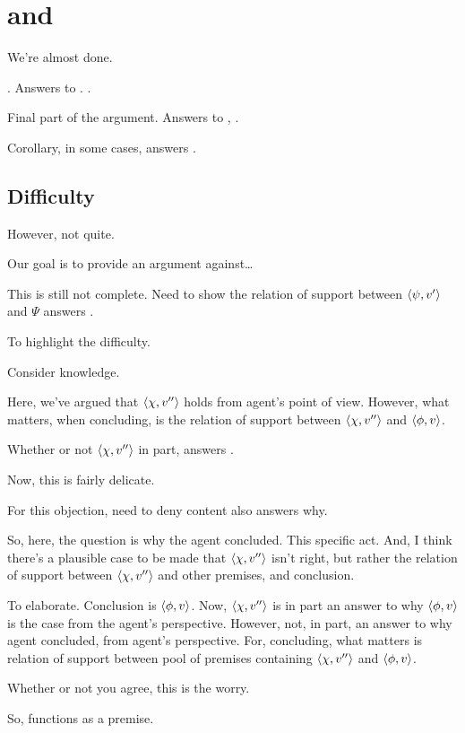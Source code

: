 \chapter{ and \qWhy{}}
\label{cha:fc-why}

\begin{note}
  We're almost done.

  \qzS{}.
  Answers to \qzS{}.
  .
\end{note}

\begin{note}
  Final part of the argument.
  Answers to \qzS{}, \qWhy{}.

  Corollary, in some cases, \fc{} answers \qWhy{}.
\end{note}

\section{Difficulty}
\label{cha:fc-why:sec:difficulty}

\begin{note}
  However, not quite.

  Our goal is to provide an argument against\dots

  This is still not complete.
  Need to show the relation of support between \(\langle \psi, v' \rangle\) and \(\Psi\) answers \qWhy{}.

  To highlight the difficulty.

  Consider knowledge.

  Here, we've argued that \(\langle \chi, v'' \rangle\) holds from agent's point of view.
  However, what matters, when concluding, is the relation of support between \(\langle \chi, v'' \rangle\) and \(\langle \phi, v \rangle\).

  Whether or not \(\langle \chi, v'' \rangle\) in part, answers \qWhy{}.
\end{note}

\begin{note}
  Now, this is fairly delicate.

  For this objection, need to deny content also answers why.

  So, here, the question is why the agent concluded.
  This specific act.
  And, I think there's a plausible case to be made that \(\langle \chi, v'' \rangle\) isn't right, but rather the relation of support between \(\langle \chi, v'' \rangle\) and other premises, and conclusion.

  To elaborate.
  Conclusion is \(\langle \phi, v \rangle\).
  Now, \(\langle \chi, v'' \rangle\) is in part an answer to why \(\langle \phi, v \rangle\) is the case from the agent's perspective.
  However, not, in part, an answer to why agent concluded, from agent's perspective.
  For, concluding, what matters is relation of support between pool of premises containing \(\langle \chi, v'' \rangle\) and \(\langle \phi, v \rangle\).

  Whether or not you agree, this is the worry.

  So, functions as a premise.
\end{note}

